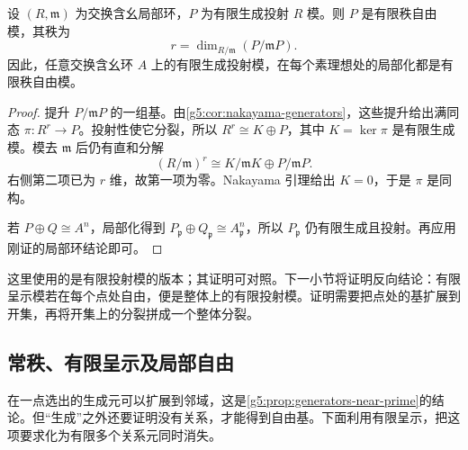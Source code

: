 \begin{proposition}
\label{g5:prop:projective-local-free}
	设 \((R,\mathfrak m)\) 为交换含幺局部环，\(P\) 为有限生成投射 \(R\) 模。则 \(P\) 是有限秩自由模，其秩为
	\[
		r=\dim_{R/\mathfrak m}(P/\mathfrak mP).
	\]
	因此，任意交换含幺环 \(A\) 上的有限生成投射模，在每个素理想处的局部化都是有限秩自由模。
\end{proposition}
\begin{proof}
	提升 \(P/\mathfrak mP\) 的一组基。由\cref{g5:cor:nakayama-generators}，这些提升给出满同态 \(\pi:R^r\rightarrow P\)。投射性使它分裂，所以 \(R^r\cong K\oplus P\)，其中 \(K=\ker\pi\) 是有限生成模。模去 \(\mathfrak m\) 后仍有直和分解
	\[
		(R/\mathfrak m)^r\cong K/\mathfrak mK\oplus P/\mathfrak mP.
	\]
	右侧第二项已为 \(r\) 维，故第一项为零。Nakayama 引理给出 \(K=0\)，于是 \(\pi\) 是同构。

	若 \(P\oplus Q\cong A^n\)，局部化得到 \(P_{\mathfrak p}\oplus Q_{\mathfrak p}\cong A_{\mathfrak p}^n\)，所以 \(P_{\mathfrak p}\) 仍有限生成且投射。再应用刚证的局部环结论即可。
\end{proof}

这里使用的是有限投射模的版本；其证明可对照\cite[第2节，定理2.5的有限模情形]{Matsumura1989}。下一小节将证明反向结论：有限呈示模若在每个点处自由，便是整体上的有限投射模。证明需要把点处的基扩展到开集，再将开集上的分裂拼成一个整体分裂。

\subsection{常秩、有限呈示及局部自由}
\label{g5:subsec:0205:03}

在一点选出的生成元可以扩展到邻域，这是\cref{g5:prop:generators-near-prime}的结论。但“生成”之外还要证明没有关系，才能得到自由基。下面利用有限呈示，把这项要求化为有限多个关系元同时消失。

